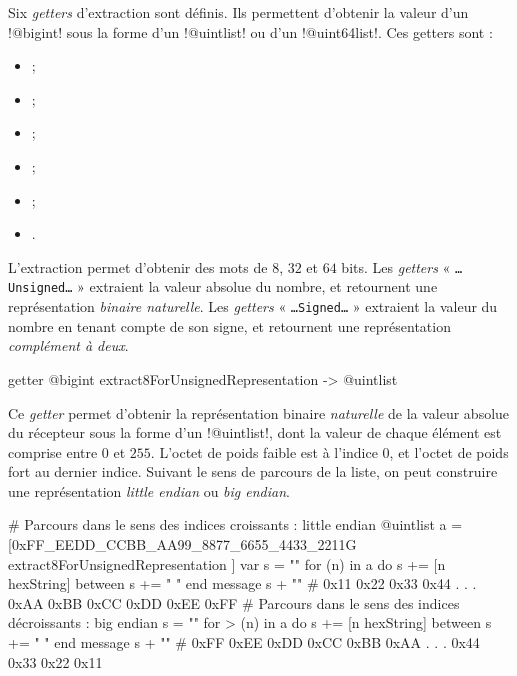 Six \emph{getters} d'extraction sont définis. Ils permettent d'obtenir la valeur d'un \ggs!@bigint! sous la forme d'un \ggs!@uintlist! ou d'un \ggs!@uint64list!. Ces getters sont :
\begin{itemize}
  \item {} ;
  \item {} ;
  \item {} ;
  \item {} ;
  \item {} ;
  \item {}.
\end{itemize}

L'extraction permet d'obtenir des mots de $8$, $32$ et $64$ bits. Les \emph{getters} « \texttt{…Unsigned…} » extraient la valeur absolue du nombre, et retournent une représentation \emph{binaire naturelle}. Les \emph{getters} « \texttt{…Signed…} » extraient la valeur du nombre en tenant compte de son signe, et retournent une représentation \emph{complément à deux}.


\begin{galgas}
getter @bigint extract8ForUnsignedRepresentation -> @uintlist
\end{galgas}

Ce \emph{getter} permet d'obtenir la représentation binaire \emph{naturelle} de la valeur absolue du récepteur sous la forme d'un \ggs!@uintlist!, dont la valeur de chaque élément est comprise entre $0$ et $255$. L'octet de poids faible est à l'indice $0$, et l'octet de poids fort au dernier indice. Suivant le sens de parcours de la liste, on peut construire une représentation \emph{little endian} ou \emph{big endian}.

\begin{galgas}
# Parcours dans le sens des indices croissants : little endian
@uintlist a = [0xFF_EEDD_CCBB_AA99_8877_6655_4433_2211G
  extract8ForUnsignedRepresentation
]
var s = ""
for (n) in a
  do s += [n hexString]
  between s += " "
end
message s + "\n" # 0x11 0x22 0x33 0x44 . . . 0xAA 0xBB 0xCC 0xDD 0xEE 0xFF 
# Parcours dans le sens des indices décroissants : big endian
s = ""
for > (n) in a
  do s += [n hexString]
  between s += " "
end
message s + "\n" # 0xFF 0xEE 0xDD 0xCC 0xBB 0xAA . . . 0x44 0x33 0x22 0x11
\end{galgas}

